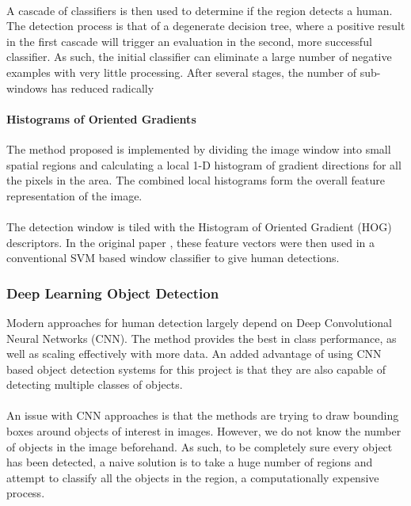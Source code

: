 \paragraph{}A cascade of classifiers is then used to determine if the region detects a human. The detection process is that of a degenerate decision tree, where a positive result in the first cascade will trigger an evaluation in the second, more successful classifier. As such, the initial classifier can eliminate a large number of negative examples with very little processing. After several stages, the number of sub-windows has reduced radically

\paragraph{Histograms of Oriented Gradients}
The method proposed is implemented by dividing the image window into small spatial regions and calculating a local 1-D histogram of gradient directions for all the pixels in the area. The combined local histograms form the overall feature representation of the image.

\paragraph{}The detection window is tiled with the Histogram of Oriented Gradient (HOG) descriptors. In the original paper \cite{Dalal2005}, these feature vectors were then used in a conventional SVM based window classifier  to give human detections.

\subsubsection{Deep Learning Object Detection}
Modern approaches for human detection largely depend on Deep Convolutional Neural Networks (CNN). The method provides the best in class performance, as well as scaling effectively with more data. An added advantage of using CNN based object detection systems for this project is that they are also capable of detecting multiple classes of objects.

\paragraph{}An issue with CNN approaches is that the methods are trying to draw bounding boxes around objects of interest in images. However, we do not know the number of objects in the image beforehand. As such, to be completely sure every object has been detected, a naive solution is to take a huge number of regions and attempt to classify all the objects in the region, a computationally expensive process.

